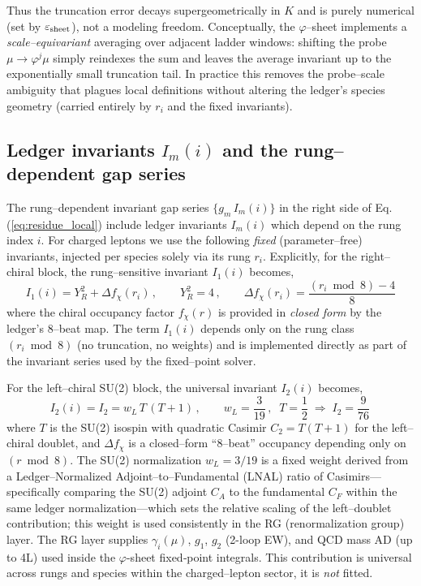 \documentclass[%
  amsmath,amssymb,
  aps,
 prb,
 floatfix, showkeys
 ]{revtex4-2}
\begin{document}
 Thus the truncation error decays supergeometrically in $K$ and is purely numerical
 (set by $\varepsilon_{\rm sheet}$), not a modeling freedom.
 Conceptually, the $\varphi$--sheet implements a \emph{scale–equivariant} averaging over
 adjacent ladder windows: shifting the probe $\mu\!\to\!\varphi^j\mu$ simply reindexes
 the sum and leaves the average invariant up to the exponentially small truncation tail.
 In practice this removes the probe--scale ambiguity that plagues local definitions without
 altering the ledger's species geometry (carried entirely by $r_i$ and the fixed invariants).
 
 \subsection{Ledger invariants $I_m(i)$ and the rung–dependent gap series}
 \label{subsec:ledger-invariants}
 The rung--dependent invariant gap series
 $\{g_m\,I_m(i)\}$ in the right side of
 Eq.(\ref{eq:residue_local}) include ledger invariants $I_m(i)$ which depend on the
 rung index $i$. 
 For charged leptons we use the following \emph{fixed} (parameter–free) invariants,
 injected per species solely via its rung $r_i$.
 Explicitly, for the right--chiral block, the rung--sensitive 
 invariant $I_1(i)$  becomes,
 \begin{equation}
   I_1(i) =  Y_R^2  + \Delta f_\chi(r_i) \,, \qquad Y_R^2 = 4  \, , \qquad 
   \Delta f_\chi(r_i) = \frac{(r_i\bmod 8) - 4}{8} 
   \label{eq:I1_def}
 \end{equation}
 where the chiral occupancy factor $f_\chi(r)$ is provided in \emph{closed form}
 by the ledger's 8--beat map.
 The term  $I_1(i)$ depends only on the rung class $(r_i\bmod 8)$
 (no truncation, no weights) and is implemented directly as part of
 the invariant series used by the fixed--point solver.
 
 For the left--chiral SU(2) block, the universal invariant $I_2(i)$ becomes, 
 \begin{equation}
   I_2(i)  = I_2 = w_L\,T\,(T+1) \, ,  \qquad w_L=\frac{3}{19}\,,\;\;
   T=\frac{1}{2}\;\Rightarrow\; I_2=\frac{9}{76}\,
 \label{eq:I2_def}
 \end{equation}
 where  $T$ is the SU(2) isospin with quadratic Casimir $C_2 = T(T+1)$ for the
 left–chiral doublet, and $\Delta f_\chi$ is a closed–form ``8–beat''
 occupancy depending only on $(r\bmod 8)$. The SU(2) normalization $w_L=3/19$
 is a fixed weight derived from a Ledger–Normalized Adjoint–to–Fundamental (LNAL) ratio of Casimirs—specifically comparing the SU(2) adjoint $C_A$ to the fundamental $C_F$ within the same ledger normalization—which sets the relative scaling of the left–doublet contribution; this weight is used consistently in the RG (renormalization group)  layer.
 The RG layer supplies $\gamma_i(\mu)$, $g_1$, $g_2$ (2-loop EW), and
 QCD mass AD (up to 4L) used inside the $\varphi$-sheet fixed‑point integrals.
 This contribution is universal across rungs and species within the charged--lepton sector,
  it is \emph{not} fitted.
 
\end{document}
